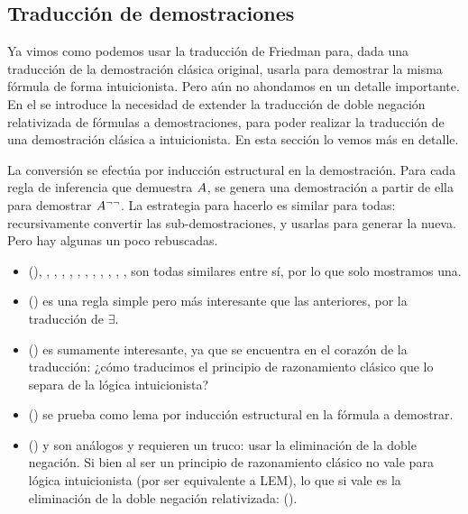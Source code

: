 \subsection{Traducción de demostraciones}
\label{fri:sec:proof-trans}

Ya vimos como podemos usar la traducción de Friedman para, dada una traducción de la demostración clásica original, usarla para demostrar la misma fórmula de forma intuicionista. Pero aún no ahondamos en un detalle importante. En el  se introduce la necesidad de extender la traducción de doble negación relativizada de fórmulas a demostraciones, para poder realizar la traducción de una demostración clásica a intuicionista. En esta sección lo vemos más en detalle.

La conversión se efectúa por inducción estructural en la demostración. Para cada regla de inferencia que demuestra $A$, se genera una demostración a partir de ella para demostrar $A^{\neg\neg}$. La estrategia para hacerlo es similar para todas: recursivamente convertir las sub-demostraciones, y usarlas para generar la nueva. Pero hay algunas un poco rebuscadas.

\begin{itemize}
    \item {} (), , , , ,
          , , , , , , ,  son todas similares entre sí, por lo que solo mostramos una.
    \item {} () es una regla simple pero más interesante que las anteriores, por la traducción de $\exists$.
    \item {} () es sumamente interesante, ya que se encuentra en el corazón de la traducción: ¿cómo traducimos el principio de razonamiento clásico que lo separa de la lógica intuicionista?
    \item {} ()  se prueba como lema por inducción estructural en la fórmula a demostrar.
    \item {} () y  son análogos y requieren un truco: usar la eliminación de la doble negación. Si bien al ser un principio de razonamiento clásico no vale para lógica intuicionista (por ser equivalente a LEM), lo que si vale es la eliminación de la doble negación relativizada:  ().
\end{itemize}

